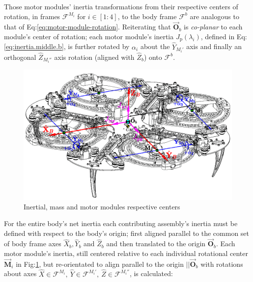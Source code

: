 \par
Those motor modules' inertia transformations from their respective centers of rotation, in frames $\mathcal{F}^{M_i}$ for $i\in[1:4]$, to the body frame $\mathcal{F}^b$ are analogous to that of Eq:\ref{eq:motor-module-rotation}. Reiterating that $\vec{\mathbf{O}}_b$ is \emph{co-planar} to each module's center of rotation; each motor module's inertia $J_\text{p}(\lambda_i)$, defined in Eq:\ref{eq:inertia.middle.b}, is further rotated by $\alpha_{i}$ about the $\hat{Y}_{M_i'}$ axis and finally an orthogonal $\hat{Z}_{M_i''}$  axis rotation (aligned with $\hat{Z}_b$) onto $\mathcal{F}^b$. 
\par
\begin{figure}[hbtp]
\vspace{-6pt}
\centering
\includegraphics[width=\textwidth]{figs/inertia-frame}
\caption{Inertial, mass and motor modules respective centers}
\label{fig:inertia-frame}
\vspace{-6pt}
\end{figure}
For the entire body's net inertia each contributing assembly's inertia must be defined with respect to the body's origin; first aligned parallel to the common set of body frame axes $\hat{X}_b,\hat{Y}_b$ and $\hat{Z}_b$ and then translated to the origin $\vec{\mathbf{O}}_b$. Each motor module's inertia, still centered relative to each individual rotational center $\vec{\mathbf{M}}_i$ in Fig:\ref{fig:inertia-frame}, but re-orientated to align parallel to the origin $||\vec{\mathbf{O}}_b$ with rotations about axes $\hat{X}\in\mathcal{F}^{M_i},~\hat{Y}\in\mathcal{F}^{M_i'},~\hat{Z}\in\mathcal{F}^{M_i''}$, is calculated:
